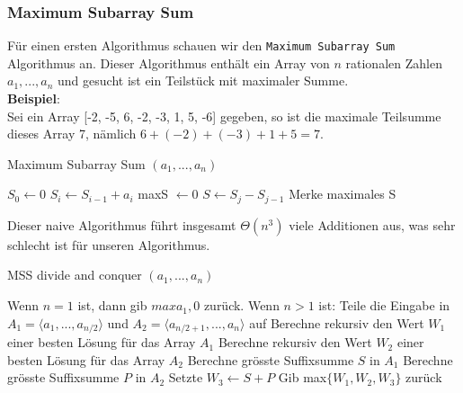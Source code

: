 \documentclass[a4paper]{article}
\begin{document}
    \subsubsection{Maximum Subarray Sum}
    Für einen ersten Algorithmus schauen wir den \texttt{Maximum Subarray Sum} Algorithmus an. Dieser Algorithmus enthält ein Array von $n$ rationalen Zahlen $a_1,..., a_n$ und gesucht ist ein Teilstück mit maximaler Summe.  \\
    \textbf{Beispiel}: \\
    Sei ein Array [-2, -5, 6, -2, -3, 1, 5, -6] gegeben, so ist die maximale Teilsumme dieses Array 7, nämlich $ 6 + (-2) + (-3) + 1 + 5 = 7$. \\
      
\begin{algorithm}
    \caption{Maximum Subarray Sum $(a_1,..., a_n)$}\label{MSS-1}
    \begin{algorithmic}[1]
    \State $S_0 \gets 0$ 
        \State $S_i \gets S_{i-1} + a_i$ 
    \EndFor
    \State maxS $\gets 0$
            \State $S \gets S_j - S_{j-1}$ 
           \State Merke maximales S
        \EndFor
    \EndFor
    \EndFunction

    \end{algorithmic}
    
\end{algorithm}

Dieser naive Algorithmus führt insgesamt $\Theta(n^3)$ viele Additionen aus, was sehr schlecht ist für unseren Algorithmus.

\begin{algorithm}
 \caption{MSS divide and conquer $(a_1,..., a_n)$}\label{MSS-Div}
 \begin{algorithmic}[1]
      \State Wenn $n=1$ ist, dann gib $max{a_1,0}$ zurück.
      \State Wenn $n>1$ ist:
      \State Teile die Eingabe in $A_1 = \langle a_1,...,a_{n/2} \rangle$ und $A_2 = \langle a_{n/2+1},...,a_{n} \rangle$ auf
      \State Berechne rekursiv den Wert $W_1$ einer besten Lösung für das Array $A_1$
      \State Berechne rekursiv den Wert $W_2$ einer besten Lösung für das Array $A_2$
      \State Berechne grösste Suffixsumme $S$ in $A_1$
      \State Berechne grösste Suffixsumme $P$ in $A_2$
      \State Setzte $W_3 \gets S+P$
      \State Gib max$\{W_1, W_2, W_3\}$ zurück
    \EndFunction
 \end{algorithmic}
\end{algorithm}
\end{document}
